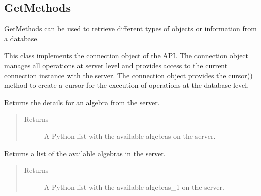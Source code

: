 \documentclass[letterpaper,10pt,english]{sphinxmanual}
\begin{document}
\subsection{Get\sphinxhyphen{}Methods}
\label{\detokenize{index:get-methods}}
Get\sphinxhyphen{}Methods can be used to retrieve different types of objects or information from a  database.

\begin{fulllineitems}
\label{\detokenize{index:id1}}
This class implements the connection object of the  API. The connection object manages all operations at server
level and provides access to the current connection instance with the server. The connection object provides the
cursor() method to create a cursor for the execution of operations at the database level.

\begin{fulllineitems}
\label{\detokenize{index:secondodb.api.secondoapi.Connection.get_algebra}}
Returns the details for an algebra from the  server.
\begin{quote}\begin{description}
\item[{Returns}] \leavevmode
A Python list with the available algebras on the  server.

\end{description}\end{quote}

\end{fulllineitems}


\begin{fulllineitems}
\label{\detokenize{index:secondodb.api.secondoapi.Connection.get_list_algebras}}
Returns a list of the available algebras in the  server.
\begin{quote}\begin{description}
\item[{Returns}] \leavevmode
A Python list with the available algebras\_1 on the  server.


\end{description}
\end{quote}
\end{fulllineitems}
\end{fulllineitems}
\end{document}
